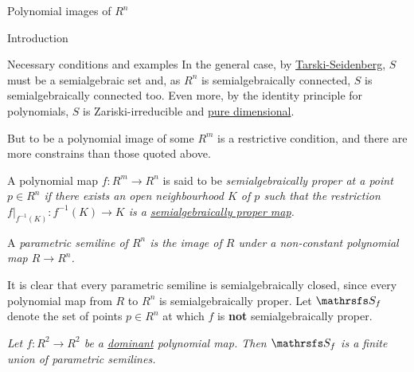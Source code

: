 \documentclass[11pt, a4paper, english, twoside, notitlepage, openright]{report}
\begin{document}
\begin{chapter}{Polynomial images of $R^n$}
\begin{section}{Introduction}
\begin{subsection}{Necessary conditions and examples}
In the general case, by \hyperref[tarskiSeidenberg]{Tarski-Seidenberg}, $S$ must be a semialgebraic set and, as $R^n$ is semialgebraically connected, $S$ is semialgebraically connected too. Even more, by the identity principle for polynomials, $S$ is Zariski-irreducible and \hyperref[pureDim]{pure dimensional}.
	
	
But to be a polynomial image of some $R^m$ is a restrictive condition, and there are more constrains than those quoted above. 
	
\begin{definition} A polynomial map $f:R^m\to R^n$ is said to be \em semialgebraically proper at a point $p\in R^n$ \em if there exists an open neighbourhood $K$ of $p$ such that the restriction $f|_{f^{-1}(K)}:f^{-1}(K)\to K$ is a \hyperref[properMap]{semialgebraically proper map}.
\end{definition}
	
\begin{definition} A \em parametric semiline \em of $R^n$ is the image of $R$ under a non-constant polynomial map $R\to R^n$.
\end{definition}
	
It is clear that every parametric semiline is semialgebraically closed, since every polynomial map from $R$ to $R^n$ is semialgebraically proper. Let $\S_f$ denote the set of points $p\in R^n$ at which $f$ is \textbf{not} semialgebraically proper.
	
\begin{theorem}[\em Jelonek\em]\label{jelonek}\em Let $f:R^2\to R^2$ be a \hyperref[dominant]{dominant} polynomial map. Then $\S_f$ is a finite union of parametric semilines.\em
\end{theorem}
	

\end{subsection}
\end{section}
\end{chapter}
\end{document}
